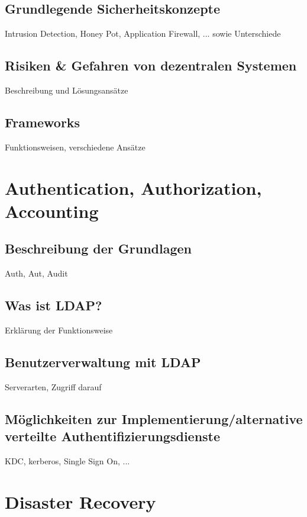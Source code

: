 \documentclass[letterpaper, 12pt]{article}
\let\tempsection\section
\renewcommand\section[1]{\vspace{-0.3cm}\tempsection{#1}\vspace{-0.3cm}}
\let\tempsubsection\subsection
\renewcommand\subsection[1]{\vspace{0cm}\tempsubsection{#1}\vspace{0cm}}
\begin{document}
\subsection{Grundlegende Sicherheitskonzepte}

Intrusion Detection, Honey Pot, Application Firewall, ... sowie Unterschiede

\subsection{Risiken \& Gefahren von dezentralen Systemen}

Beschreibung und Lösungsansätze

\subsection{Frameworks}

Funktionsweisen, verschiedene Ansätze

\clearpage

\section{Authentication, Authorization, Accounting}

\subsection{Beschreibung der Grundlagen}

Auth, Aut, Audit

\subsection{Was ist LDAP?}
Erklärung der Funktionsweise

\subsection{Benutzerverwaltung mit LDAP}

Serverarten, Zugriff darauf

\subsection{Möglichkeiten zur Implementierung/alternative verteilte Authentifizierungsdienste}

KDC, kerberos, Single Sign On, ...

\clearpage

\section{Disaster Recovery}
\end{document}
